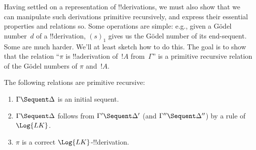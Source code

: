 \documentclass[../../../include/open-logic-section]{subfiles}
\begin{document}
\begin{explain}
Having settled on a representation of !!{derivation}s, we must also
show that we can manipulate such derivations primitive recursively, and
express their essential properties and relations so.  Some operations
are simple: e.g., given a G\"odel number~$d$ of a !!{derivation},
$(s)_1$ gives us the G\"odel number of its end-sequent.  Some are much
harder.  We'll at least sketch how to do this.  The goal is to show
that the relation ``$\pi$ is !!a{derivation} of~$!A$ from~$\Gamma$''
is a primitive recursive relation of the G\"odel numbers of $\pi$
and~$!A$.
\end{explain}

\begin{prop}
The following relations are primitive recursive:
\begin{enumerate}
\item $\Gamma \Sequent \Delta$ is an initial sequent.
\item $\Gamma \Sequent \Delta$ follows from $\Gamma' \Sequent \Delta'$
  (and $\Gamma'' \Sequent \Delta''$) by a rule of $\Log{LK}$.
\item $\pi$ is a correct $\Log{LK}$-!!{derivation}.
\end{enumerate}
\end{prop}
\end{document}
